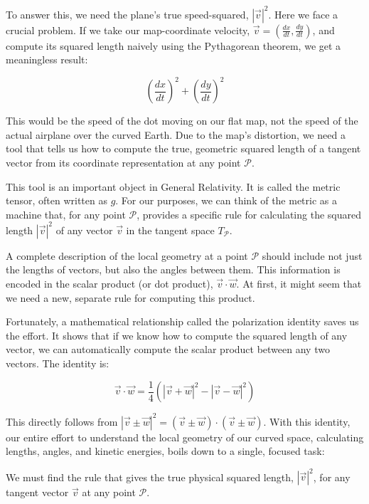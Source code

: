 \documentclass[twocolumn]{article}
\begin{document}
To answer this, we need the plane's true speed-squared, \(|\vec{v}|^2\).
Here we face a crucial problem. If we take our map-coordinate velocity,
\(\vec{v} = \left(\frac{dx}{dt}, \frac{dy}{dt}\right)\), and compute its
squared length naively using the Pythagorean theorem, we get a
meaningless result:

\begin{equation}
\left( \frac{dx}{dt} \right)^2 + \left( \frac{dy}{dt} \right)^2
\end{equation}

This would be the speed of the dot moving on our flat map, not the speed
of the actual airplane over the curved Earth. Due to the map's
distortion, we need a tool that tells us how to compute the true,
geometric squared length of a tangent vector from its coordinate
representation at any point \(\mathcal{P}\).

This tool is an important object in General Relativity. It is called the
metric tensor, often written as \(g\). For our purposes, we can think of
the metric as a machine that, for any point \(\mathcal{P}\), provides a specific
rule for calculating the squared length \(|\vec{v}|^2\) of any vector
\(\vec{v}\) in the tangent space \(T_\mathcal{P}\).

A complete description of the local geometry at a point \(\mathcal{P}\) should
include not just the lengths of vectors, but also the angles between
them. This information is encoded in the scalar product (or dot
product), \(\vec{v} \cdot \vec{w}\). At first, it might seem that we
need a new, separate rule for computing this product.

Fortunately, a mathematical relationship called the polarization
identity saves us the effort. It shows that if we know how to compute
the squared length of any vector, we can automatically compute the
scalar product between any two vectors. The identity is:

\begin{equation}
\vec{v} \cdot \vec{w} = \frac{1}{4} \left( |\vec{v} + \vec{w}|^2 - |\vec{v} - \vec{w}|^2 \right)
\end{equation}

This directly follows from \(|\vec{v} \pm \vec{w}|^2=(\vec{v} \pm \vec{w})\cdot(\vec{v} \pm \vec{w})\).
With this identity, our entire effort to understand the local geometry
of our curved space, calculating lengths, angles, and kinetic
energies, boils down to a single, focused task:

We must find the rule that gives the true physical squared length,
$ |\vec{v}|^2 $, for any tangent vector $ \vec{v} $
at any point \(\mathcal{P}\).
\end{document}
